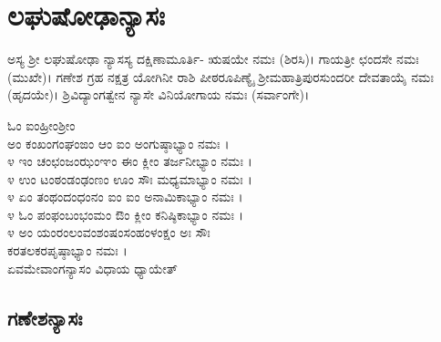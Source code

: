 \section{ಲಘುಷೋಢಾನ್ಯಾಸಃ}
ಅಸ್ಯ ಶ್ರೀ ಲಘುಷೋಢಾ ನ್ಯಾಸಸ್ಯ ದಕ್ಷಿಣಾಮೂರ್ತಿ- ಋಷಯೇ ನಮಃ (ಶಿರಸಿ)। ಗಾಯತ್ರೀ ಛಂದಸೇ ನಮಃ (ಮುಖೇ)। ಗಣೇಶ ಗ್ರಹ ನಕ್ಷತ್ರ ಯೋಗಿನೀ ರಾಶಿ ಪೀಠರೂಪಿಣ್ಯೈ ಶ್ರೀಮಹಾತ್ರಿಪುರಸುಂದರೀ ದೇವತಾಯೈ ನಮಃ (ಹೃದಯೇ)।  ಶ್ರಿವಿದ್ಯಾಂಗತ್ವೇನ ನ್ಯಾಸೇ ವಿನಿಯೋಗಾಯ ನಮಃ (ಸರ್ವಾಂಗೇ)।

ಓಂ ಐಂಹ್ರೀಂಶ್ರೀಂ \\ಅಂ ಕಂಖಂಗಂಘಂಙಂ ಆಂ ಐಂ ಅಂಗುಷ್ಠಾಭ್ಯಾಂ ನಮಃ ।\\
೪ ಇಂ ಚಂಛಂಜಂಝಂಞಂ ಈಂ ಕ್ಲೀಂ ತರ್ಜನೀಭ್ಯಾಂ ನಮಃ ।\\
೪ ಉಂ ಟಂಠಂಡಂಢಂಣಂ ಊಂ ಸೌಃ ಮಧ್ಯಮಾಭ್ಯಾಂ ನಮಃ ।\\
೪ ಏಂ ತಂಥಂದಂಧಂನಂ ಐಂ ಐಂ ಅನಾಮಿಕಾಭ್ಯಾಂ ನಮಃ ।\\
೪ ಓಂ ಪಂಫಂಬಂಭಂಮಂ ಔಂ ಕ್ಲೀಂ ಕನಿಷ್ಠಿಕಾಭ್ಯಾಂ ನಮಃ ।\\
೪ ಅಂ ಯಂರಂಲಂವಂಶಂಷಂಸಂಹಂಳಂಕ್ಷಂ ಅಃ ಸೌಃ\\ ಕರತಲಕರಪೃಷ್ಠಾಭ್ಯಾಂ ನಮಃ ।\\
ಏವಮೇವಾಂಗನ್ಯಾಸಂ ವಿಧಾಯ ಧ್ಯಾಯೇತ್ 

\subsection{ಗಣೇಶನ್ಯಾಸಃ}


